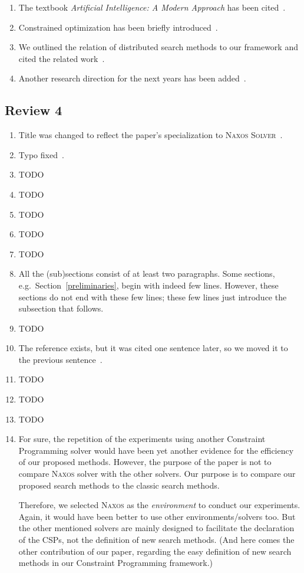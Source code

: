 \documentclass{ws-ijait}
\begin{document}
\begin{enumerate}
  \item The textbook \emph{Artificial Intelligence: A Modern
        Approach} has been cited~.
  \item Constrained optimization has been briefly
        introduced~.
  \item We outlined the relation of distributed search
        methods to our framework and cited the related
        work~.
  \item Another research direction for the next years has
        been added~.
\end{enumerate}

\subsection*{Review 4}

\begin{enumerate}
  \item Title was changed to reflect the paper's
        specialization to \textsc{Naxos
        Solver}~.
  \item Typo fixed~.
  \item TODO
  \item TODO
  \item TODO
  \item TODO
  \item TODO
  \item All the (sub)sections consist of at least two
        paragraphs. Some sections, e.g.\ 
        Section~\ref{preliminaries}, begin with indeed few
        lines. However, these sections do not end with these
        few lines; these few lines just introduce the
        subsection that follows.
  \item TODO
  \item The reference exists, but it was cited one sentence
        later, so we moved it to the previous
        sentence~.
  \item TODO
  \item TODO
  \item TODO
  \item For sure, the repetition of the experiments using
        another Constraint Programming solver would have
        been yet another evidence for the efficiency of our
        proposed methods. However, the purpose of the paper
        is not to compare \textsc{Naxos} solver with the
        other solvers. Our purpose is to compare our
        proposed search methods to the classic search
        methods.

        Therefore, we selected \textsc{Naxos} as the
        \emph{environment} to conduct our experiments.
        Again, it would have been better to use other
        environments\slash solvers too. But the other
        mentioned solvers are mainly designed to facilitate
        the declaration of the CSPs, not the definition of
        new search methods. (And here comes the other
        contribution of our paper, regarding the easy
        definition of new search methods in our Constraint
        Programming framework.)
\end{enumerate}
\end{document}
